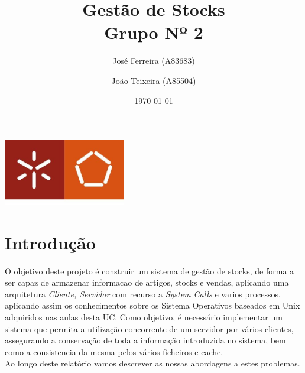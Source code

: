 \documentclass[a4paper]{report}
\begin{document}
\title{Gestão de Stocks\\ 
\large Grupo Nº 2}
\author{José Ferreira (A83683) \and João Teixeira (A85504)}
\date{\today}

\begin{center}
    \begin{minipage}{0.75\linewidth}
        \centering
        \includegraphics[width=0.4\textwidth]{eng.jpeg}\par\vspace{1cm}
        \vspace{1.5cm}
        \href{https://www.uminho.pt/PT}
        {\color{black}{\scshape\LARGE Universidade do Minho}} \par
        \vspace{1cm}
        \href{https://www.di.uminho.pt/}
        {\color{black}{\scshape\Large Departamento de Informática}} \par
        \vspace{1.5cm}
        \maketitle
    \end{minipage}
\end{center}

\tableofcontents

\pagebreak

\chapter{Introdução}

O objetivo deste projeto é construir um sistema de gestão de stocks,
de forma a ser capaz de armazenar informacao de artigos, stocks e vendas,
aplicando uma arquitetura \textit{Cliente, Servidor} com recurso a \textit{System Calls}
e varios processos, aplicando assim os conhecimentos sobre os Sistema Operativos 
baseados em Unix adquiridos nas aulas desta UC\@.
Como objetivo, é necessário implementar um sistema que permita a utilização concorrente de 
um servidor por vários clientes, assegurando a conservação de toda a informação
introduzida no sistema, bem como a consistencia da mesma pelos vários ficheiros
e cache.\\
Ao longo deste relatório vamos descrever as nossas abordagens a estes problemas.
\end{document}
